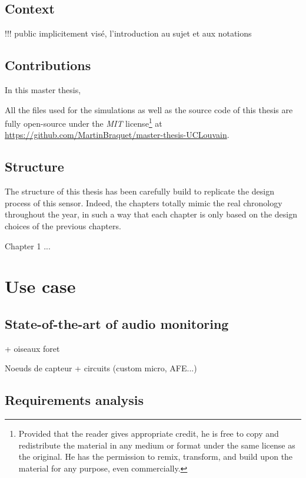 \documentclass{EPL-master-thesis-covers-EN}
\begin{document}
\section*{Context}

!!! public implicitement visé, l'introduction au sujet et aux notations

\section*{Contributions}

In this master thesis,

All the files used for the simulations as well as the source code of this thesis are fully open-source under the \textit{MIT} license\footnote{Provided that the reader gives appropriate credit, he is free to copy and redistribute the material in any medium or format under the same license as the original. He has the permission to remix, transform, and build upon the material for any purpose, even commercially.} at \url{https://github.com/MartinBraquet/master-thesis-UCLouvain}.

\section*{Structure}

The structure of this thesis has been carefully build to replicate the design process of this sensor. Indeed, the chapters totally mimic the real chronology throughout the year, in such a way that each chapter is only based on the design choices of the previous chapters. 

Chapter 1 ...



\chapter{Use case}

\section{State-of-the-art of audio monitoring}

+ oiseaux foret

Noeuds de capteur + circuits (custom micro, AFE...)​


\section{Requirements analysis}
\end{document}
